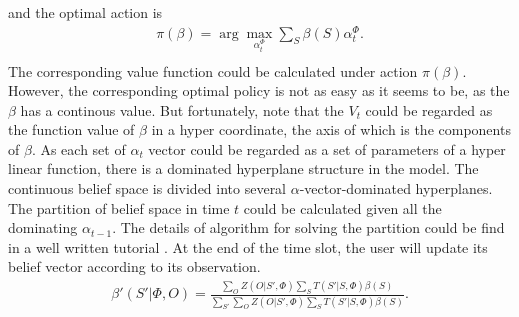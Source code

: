 \documentclass[conference]{IEEEtran}
\begin{document}
and the optimal action is
\begin{equation}
\begin{aligned}
	\pi\left(\beta\right) =
	\arg\underset{\alpha_t^\Phi}{\max}\sum\limits_{S}\beta\left(S\right)\alpha_t^\Phi.\\
\end{aligned}
\end{equation}
The corresponding value function could be calculated under action \(\pi\left(\beta\right)\).
However, the corresponding optimal policy is not as easy as it seems to be, as the \(\beta\) has a continous value.
But fortunately, note that the \(V_t\) could be regarded as the function value of \(\beta\) in a hyper coordinate,
the axis of which is the components of \(\beta\).
As each set of \(\alpha_t\) vector could be regarded as a set of parameters of a hyper linear function,
there is a dominated hyperplane structure in the model.
The continuous belief space is divided into several \(\alpha\)-vector-dominated hyperplanes.
The partition of belief space in time \(t\) could be calculated given all the dominating \(\alpha_{t-1}\).
The details of algorithm for solving the partition could be find in a well written tutorial \cite{pomdptool}.
At the end of the time slot, the user will update its belief vector according to its observation.
\begin{align}
	\beta'\left(S'|\Phi, O\right) = \frac{\sum_{O}Z\left(O|S',\Phi\right)\sum_{S}
	T\left(S'|S,\Phi\right)\beta\left(S\right)}
	{\sum_{S'}\sum_{O}Z\left(O|S',\Phi\right)\sum_{S}T\left(S'|S,\Phi\right)\beta\left(S\right)}.
\end{align}
\end{document}
